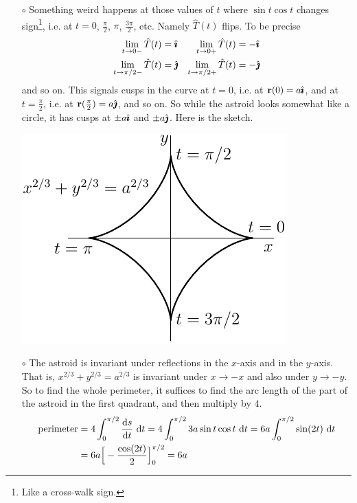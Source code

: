 \begin{eg}
\begin{itemize}
\item[$\circ$]
Something weird happens at those values of $t$ where $\sin t\cos t$ changes sign\footnote{Like a cross-walk sign.},
i.e. at $t=0$, $\frac{\pi}{2}$, $\pi$, $\frac{3\pi}{2}$, etc. Namely $\hat T(t)$ 
flips. To be precise
\begin{align*}
\lim_{t\rightarrow 0-}\hat T(t) &= \hat{\pmb{\imath}} &
\lim_{t\rightarrow 0+}\hat T(t) &= -\hat{\pmb{\imath}} \\
\lim_{t\rightarrow \pi/2-}\hat T(t) &= \hat{\pmb{\jmath}} &
\lim_{t\rightarrow \pi/2+}\hat T(t) &= -\hat{\pmb{\jmath}} 
\end{align*}
and so on. This signals cusps in the curve at $t=0$, i.e. at $\mathbf{r}(0) = a\hat{\pmb{\imath}}$,
and at $t=\frac{\pi}{2}$, i.e. at $\mathbf{r}(\frac{\pi}{2}) = a\hat{\pmb{\jmath}}$, and so on. So
while the astroid looks somewhat like a circle, it has cusps at $\pm a\hat{\pmb{\imath}}$ and $\pm a\hat{\pmb{\jmath}}$. Here is the sketch.
\begin{efig}
\begin{center}
     \includegraphics{astroid4.pdf}
\end{center}
\end{efig}
\item[$\circ$] The astroid is invariant under reflections in the $x$-axis and in the 
$y$-axis. That is, $x^{2/3}+y^{2/3} = a^{2/3}$ is invariant under $x\rightarrow -x$ 
and also under $y\rightarrow -y$. So to find the whole perimeter, it suffices to find the 
arc length of the part of the astroid in the first quadrant, and then multiply by $4$.
\begin{align*}
\text{perimeter}
&=4\int_0^{\pi/2}\diff{s}{t}\ \dee{t}
 = 4\int_0^{\pi/2}3a\sin t\cos t\ \dee{t}
 = 6a\int_0^{\pi/2}\sin(2t)\ \dee{t} \\
 &=6a\Big[-\frac{\cos(2t)}{2}\Big]_0^{\pi/2}
=6a
\end{align*}
\end{itemize}

\end{eg}


